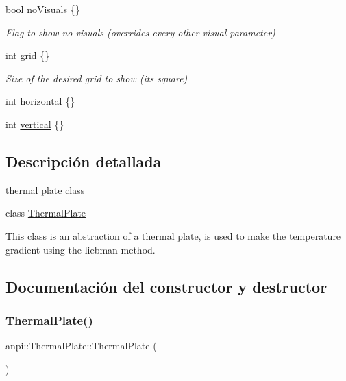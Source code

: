 \begin{DoxyCompactItemize}
bool \hyperlink{classanpi_1_1ThermalPlate_a1730343425724196f24a3340487f078d}{no\+Visuals} \{\}
\begin{DoxyCompactList}\small\item\em Flag to show no visuals (overrides every other visual parameter) \end{DoxyCompactList}\item 
int \hyperlink{classanpi_1_1ThermalPlate_a09c6cb5df28bbc7ce19b0361ffdd20f3}{grid} \{\}
\begin{DoxyCompactList}\small\item\em Size of the desired grid to show (it\textquotesingle{}s square) \end{DoxyCompactList}\item 
int \hyperlink{classanpi_1_1ThermalPlate_a915dd59f0f630a5e2c1bd46bc129ec6d}{horizontal} \{\}
\item 
int \hyperlink{classanpi_1_1ThermalPlate_a852ee99fadbce99f511a372c47c2d3ee}{vertical} \{\}
\end{DoxyCompactItemize}


\subsection{Descripción detallada}
thermal plate class 

class \hyperlink{classanpi_1_1ThermalPlate}{Thermal\+Plate}

This class is an abstraction of a thermal plate, is used to make the temperature gradient using the liebman method. 

\subsection{Documentación del constructor y destructor}
\mbox{\label{classanpi_1_1ThermalPlate_a39bd162b401db270c8c304efc5bb98c1}} 
\subsubsection{\texorpdfstring{Thermal\+Plate()}{ThermalPlate()}\hspace{0.1cm}{\footnotesize\ttfamily [1/2]}}
{\footnotesize\ttfamily anpi\+::\+Thermal\+Plate\+::\+Thermal\+Plate (\begin{DoxyParamCaption}{ }\end{DoxyParamCaption})\hspace{0.3cm}{\ttfamily [default]}}



